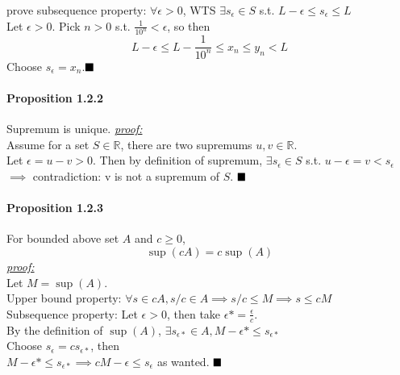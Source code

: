 \documentclass[11pt]{article}
\newcommand{\real}[0]{\mathbb{R}}
\newcommand{\proof}[0]{\textit{\underline{proof:} }}
\newcommand{\qed}[0]{$\hfill\blacksquare$}
\begin{document}
prove subsequence property: $\forall \epsilon >0$, WTS $\exists s_\epsilon \in S$ s.t. $L - \epsilon \leq s_\epsilon \leq L$\\
Let $\epsilon >0$. Pick $n > 0$ s.t. $\frac{1}{10^n} < \epsilon$, so then
$$L - \epsilon \leq L - \frac{1}{10^n} \leq x_n \leq y_n < L$$
Choose $s_\epsilon = x_n$.\qed


\paragraph{Proposition 1.2.2} Supremum is unique.
\proof\\
Assume for a set $S \in \real$, there are two supremums $u,v \in \real$. \\
Let $\epsilon = u - v > 0$.
Then by definition of supremum, $\exists s_\epsilon \in S $ s.t. $u - \epsilon = v < s_\epsilon$\\
$\implies$ contradiction: v is not a supremum of $S$. \qed
\paragraph{Proposition 1.2.3} For bounded above set $A$ and $c \geq 0$, $$\sup(cA) = c\sup(A)$$
\proof \\
Let $M = \sup(A)$.\\
Upper bound property: $\forall s \in cA, s/c \in A \implies s/c \leq M \implies s \leq cM$ \\
Subsequence property: Let $\epsilon > 0$, then take $\epsilon* = \frac{\epsilon}{c}$.\\
By the definition of $\sup(A)$, $\exists s_{\epsilon*} \in A, M - \epsilon* \leq s_{\epsilon*}$\\
Choose $s_\epsilon = cs_{\epsilon*}$, then \\
$M - \epsilon* \leq s_{\epsilon*} \implies cM - \epsilon \leq s_\epsilon$ as wanted. \qed
\end{document}
